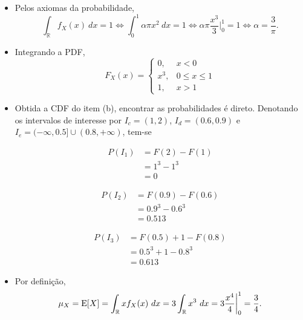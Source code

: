 \begin{itemize}
    \item [a)] Pelos axiomas da probabilidade,
    \begin{equation}
        \int_\mathbb{R} f_X(x) \ dx = 1 \iff 
        \int_0^1 \alpha\pi x^2 \ dx = 1 \iff 
        \alpha\pi \frac{x^3}{3}\bigg|_0^1 = 1 \iff 
        \alpha = \frac{3}{\pi}.
    \end{equation}
    
    \item [b)] Integrando a PDF,
    \begin{equation}
        F_X(x) = 
        \begin{cases}
            0,   & x < 0 \\
            x^3, & 0 \leq x \leq 1 \\
            1,   & x > 1
        \end{cases}
    \end{equation}

    \item [c), d), e)]
    Obtida a CDF do item (b), encontrar as probabilidades é direto.
    Denotando os intervalos de interesse por 
    $I_c = (1, 2)$, 
    $I_d = (0.6, 0.9)$ e 
    $I_e = (-\infty, 0.5] \cup (0.8, +\infty)$, tem-se
    
    \begin{minipage}{.28\textwidth}
        \begin{align*}
            P(I_1) 
            &= F(2) - F(1) \\
            &= 1^3 - 1^3 \\
            &= 0
        \end{align*}
    \end{minipage}
    \begin{minipage}{.32\textwidth}
        \begin{align*}
            P(I_2) 
            &= F(0.9) - F(0.6) \\
            &= 0.9^3 - 0.6^3 \\
            &= 0.513
        \end{align*}
    \end{minipage}
    \begin{minipage}{.36\textwidth}
        \begin{align*}
            P(I_3) 
            &= F(0.5) + 1-F(0.8) \\
            &= 0.5^3 + 1 - 0.8^3 \\
            &= 0.613
        \end{align*}
    \end{minipage}
    
    \item [f)] Por definição,
    \begin{equation}
        \mu_X = \mathrm{E}\!\left[X\right] 
        = \int_\mathbb{R} x f_X(x) \ dx
        = 3\int_\mathbb{R} x^3 \ dx
        = 3 \frac{x^4}{4}\bigg|_0^1
        = \frac{3}{4}.
    \end{equation}
\end{itemize}
